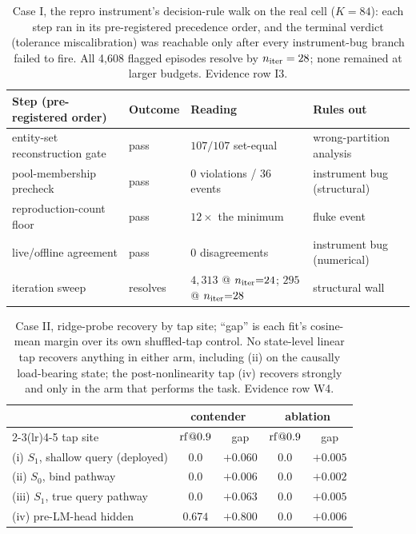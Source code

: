 \begin{table}[H]
\centering
\footnotesize
\setlength{\tabcolsep}{4pt}
\begin{tabular}{@{}llll@{}}
\toprule
Step (pre-registered order) & Outcome & Reading & Rules out \\
\midrule
entity-set reconstruction gate & pass & $107/107$ set-equal & wrong-partition analysis \\
pool-membership precheck & pass & $0$ violations / 36 events & instrument bug (structural) \\
reproduction-count floor & pass & $12\times$ the minimum & fluke event \\
live/offline agreement & pass & $0$ disagreements & instrument bug (numerical) \\
iteration sweep & resolves & $4{,}313$ @ $n_{\mathrm{iter}}{=}24$; $295$ @ $n_{\mathrm{iter}}{=}28$ & structural wall \\
\bottomrule
\end{tabular}
\caption{Case I, the repro instrument's decision-rule walk on the real
cell ($K{=}84$): each step ran in its pre-registered precedence order,
and the terminal verdict (tolerance miscalibration) was reachable only
after every instrument-bug branch failed to fire. All 4{,}608 flagged
episodes resolve by $n_{\mathrm{iter}}=28$; none remained at larger budgets.
Evidence row I3.}
\label{tab:walk}
\end{table}

\begin{table}[H]
\centering
\footnotesize
\begin{tabular}{@{}lcccc@{}}
\toprule
& \multicolumn{2}{c}{contender} & \multicolumn{2}{c}{ablation} \\
\cmidrule(lr){2-3}\cmidrule(lr){4-5}
tap site & $\mathrm{rf}@0.9$ & gap & $\mathrm{rf}@0.9$ & gap \\
\midrule
(i) $S_1$, shallow query (deployed) & $0.0$ & $+0.060$ & $0.0$ & $+0.005$ \\
(ii) $S_0$, bind pathway & $0.0$ & $+0.006$ & $0.0$ & $+0.002$ \\
(iii) $S_1$, true query pathway & $0.0$ & $+0.063$ & $0.0$ & $+0.005$ \\
(iv) pre-LM-head hidden & $\mathbf{0.674}$ & $\mathbf{+0.800}$ & $0.0$ & $+0.006$ \\
\bottomrule
\end{tabular}
\caption{Case II, ridge-probe recovery by tap site; ``gap'' is each
fit's cosine-mean margin over its own shuffled-tap control. No
state-level linear tap recovers anything in either arm, including (ii)
on the causally load-bearing state; the post-nonlinearity tap (iv)
recovers strongly and only in the arm that performs the task. Evidence
row W4.}
\label{tab:taps}
\end{table}

